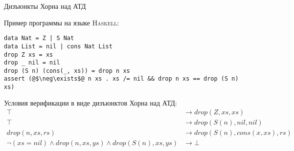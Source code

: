 \begin{frame}[fragile]{Дизъюнкты Хорна над АТД}
\begin{exampleblock}{Пример программы на языке \textsc{Haskell}:}
\begin{verbatim}
data Nat = Z | S Nat
data List = nil | cons Nat List
drop Z xs = xs
drop _ nil = nil
drop (S n) (cons(_, xs)) = drop n xs
assert (@$\neg\exists$@ n xs . xs /= nil && drop n xs == drop (S n) xs)
\end{verbatim}
\end{exampleblock}
\begin{exampleblock}{Условия верификации в виде дизъюнктов Хорна над АТД:}
\begin{align*}
\top &\rightarrow drop(Z, xs, xs)\\
\top &\rightarrow drop(S(n), nil, nil)\\
drop(n, xs, rs) &\rightarrow drop(S(n), cons(x, xs), rs)\\
\neg (xs = nil) \land drop(n, xs, ys) \land drop(S(n), xs, ys) &\rightarrow \bot
\end{align*}
\end{exampleblock}
\end{frame}

